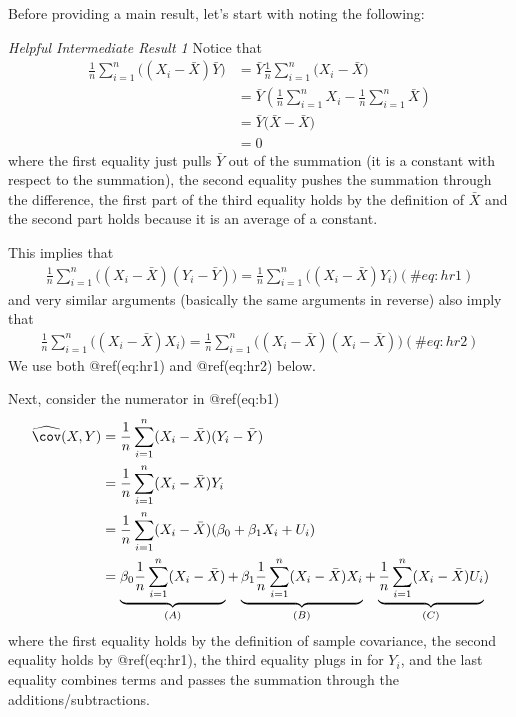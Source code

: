 \documentclass[
  letterpaper,
  DIV=11,
  numbers=noendperiod]{scrreprt}
\begin{document}
Before providing a main result, let's start with noting the following:

\emph{Helpful Intermediate Result 1} Notice that \begin{align*}
  \frac{1}{n}\sum_{i=1}^n \Big( (X_i - \bar{X})\bar{Y}\Big) &= \bar{Y} \frac{1}{n}\sum_{i=1}^n \Big( X_i-\bar{X} \Big) \\
  &= \bar{Y} \left( \frac{1}{n}\sum_{i=1}^n X_i - \frac{1}{n}\sum_{i=1}^n \bar{X} \right) \\
  &= \bar{Y} \Big(\bar{X} - \bar{X} \Big) \\
  &= 0
\end{align*} where the first equality just pulls \(\bar{Y}\) out of the
summation (it is a constant with respect to the summation), the second
equality pushes the summation through the difference, the first part of
the third equality holds by the definition of \(\bar{X}\) and the second
part holds because it is an average of a constant.

This implies that \begin{align}
  \frac{1}{n}\sum_{i=1}^n \Big( (X_i - \bar{X})(Y_i - \bar{Y})\Big) = \frac{1}{n}\sum_{i=1}^n \Big( (X_i - \bar{X})Y_i\Big) (\#eq:hr1)
\end{align} and very similar arguments (basically the same arguments in
reverse) also imply that \begin{align}
  \frac{1}{n}\sum_{i=1}^n \Big( (X_i - \bar{X})X_i\Big) = \frac{1}{n}\sum_{i=1}^n \Big( (X_i - \bar{X})(X_i - \bar{X})\Big) (\#eq:hr2)
\end{align} We use both @ref(eq:hr1) and @ref(eq:hr2) below.

\vspace{100pt}

Next, consider the numerator in @ref(eq:b1) \begin{align*}
  \widehat{\cov}(X,Y) &= \frac{1}{n} \sum_{i=1}^n (X_i - \bar{X})(Y_i - \bar{Y}) \\
  &= \frac{1}{n} \sum_{i=1}^n (X_i - \bar{X})Y_i \\
  &= \frac{1}{n} \sum_{i=1}^n (X_i - \bar{X})(\beta_0 + \beta_1 X_i + U_i) \\
  &= \underbrace{\beta_0 \frac{1}{n} \sum_{i=1}^n (X_i - \bar{X})}_{(A)} + \underbrace{\beta_1 \frac{1}{n} \sum_{i=1}^n (X_i - \bar{X}) X_i}_{(B)} + \underbrace{\frac{1}{n} \sum_{i=1}^n (X_i - \bar{X}) U_i}_{(C)}) \\
\end{align*} where the first equality holds by the definition of sample
covariance, the second equality holds by @ref(eq:hr1), the third
equality plugs in for \(Y_i\), and the last equality combines terms and
passes the summation through the additions/subtractions.
\end{document}
